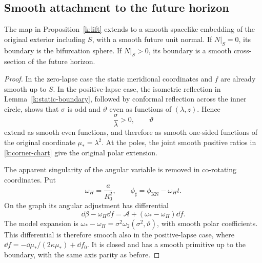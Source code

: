 \subsection{Smooth attachment to the future horizon}

\begin{proposition}\label{k:horizon}
The map in Proposition~\ref{k:lift} extends to a smooth spacelike
embedding of the original exterior including \(S\), with a smooth
future unit normal. If \(N|_S=0\), its boundary is the bifurcation
sphere. If \(N|_S>0\), its boundary is a smooth cross-section of the
future horizon.
\end{proposition}

\begin{proof}
In the zero-lapse case the static meridional coordinates and
\(f\) are already smooth up to \(S\).
In the positive-lapse case, the isometric reflection in
Lemma~\ref{k:static-boundary}, followed by conformal reflection
across the inner circle, shows that \(\sigma\) is odd and
\(\vartheta\) even as functions of \((\lambda,z)\).
Hence
\[
 \frac{\sigma}{\lambda}>0,\qquad \vartheta
\]
extend as smooth even functions, and therefore as smooth
one-sided functions of the original coordinate \(\mu_*=\lambda^2\).
At the poles, the joint smooth positive ratios in
\eqref{k:corner-chart} give the original polar extension.

The apparent singularity of the angular variable is removed in
co-rotating coordinates. Put
\[
 \omega_H=\frac a{R_0^2},\qquad
 \phi_\sharp=\phi_{\mathrm{KN}}-\omega_H t.
\]
On the graph its angular adjustment has differential
\[
 \dd\beta-\omega_H\dd f
       =\mathcal A+(\omega_*-\omega_H)\dd f.
\]
The model expansion is
\(\omega_*-\omega_H=\sigma^2\omega_2(\sigma^2,\vartheta)\),
with smooth polar coefficients. This differential is therefore
smooth also in the positive-lapse case, where
\(\dd f=-\dd\mu_*/(2\kappa\mu_*)+\dd f_0\).
It is closed and has a smooth primitive up to the boundary,
with the same axis parity as before.


\end{proof}
